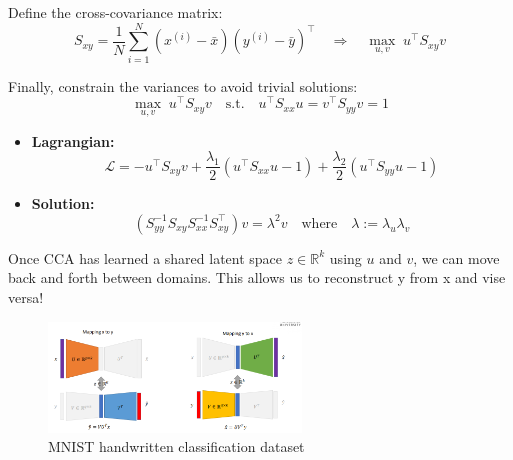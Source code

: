\documentclass[11pt]{article}
\begin{document}
Define the cross-covariance matrix:
\[
S_{xy} = \frac{1}{N} \sum_{i=1}^N (x^{(i)} - \bar{x})(y^{(i)} - \bar{y})^\top
\quad \Rightarrow \quad
\max_{u,v} \; u^\top S_{xy} v
\]

Finally, constrain the variances to avoid trivial solutions:
\[
\max_{u,v} \; u^\top S_{xy} v
\quad \text{s.t.} \quad
u^\top S_{xx} u = v^\top S_{yy} v = 1
\]

\begin{itemize}
    \item \textbf{Lagrangian:} \quad
    \[
    \mathcal{L} = -u^\top S_{xy} v 
    + \frac{\lambda_1}{2} (u^\top S_{xx} u - 1)
    + \frac{\lambda_2}{2} (u^\top S_{yy} u - 1)
    \]

    \item \textbf{Solution:} \quad
    \[
    \left(S_{yy}^{-1} S_{xy} S_{xx}^{-1} S_{xy}^\top \right) v = \lambda^2 v
    \quad \text{where} \quad \lambda := \lambda_u \lambda_v
    \]
\end{itemize}

Once CCA has learned a shared latent space $z \in \mathbb{R}^k$ using $u$ and $v$, we can move back and forth between domains.
This allows us to reconstruct y from x and vise versa!

\begin{figure}[h!]
	\centering
	\includegraphics[width=0.6\textwidth]{../imgs/cca-translation.png}
	\caption{MNIST handwritten classification dataset}
\end{figure}
\end{document}
